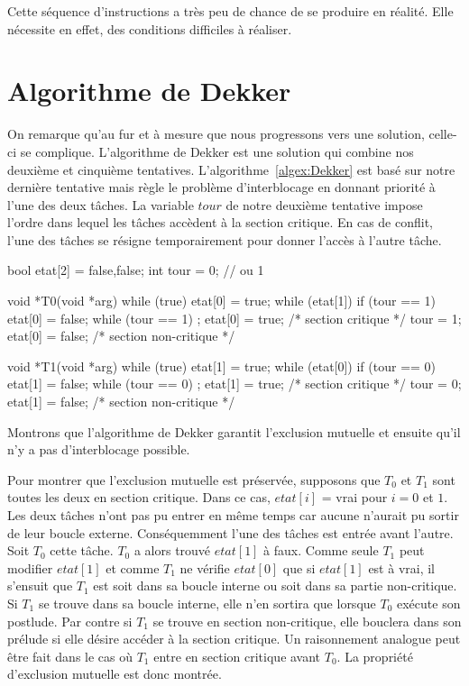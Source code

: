 \par\noindent
Cette séquence d'instructions a très peu de chance de se produire en réalité. Elle nécessite en effet, des conditions difficiles à réaliser.

\section{Algorithme de Dekker}
On remarque qu'au fur et à mesure que nous progressons vers une solution, celle-ci se complique. L'algorithme de Dekker est une solution qui combine nos deuxième et cinquième tentatives.
L'algorithme~\ref{algex:Dekker} est basé sur notre dernière tentative mais règle le problème d'interblocage en donnant priorité à l'une des deux tâches.  La variable $tour$ de notre deuxième tentative impose l'ordre dans lequel les tâches accèdent à la section critique.  En cas de conflit, l'une des tâches se résigne temporairement pour donner l'accès à l'autre tâche.

\begin{codeblock}[label=algex:Dekker, title={Algorithme de Dekker}]
bool etat[2] = {false,false};
int tour = 0; // ou 1

void *T0(void *arg)
{
  while (true) {
    etat[0] = true;
    while (etat[1])
      if (tour == 1) {
        etat[0] = false;
        while (tour == 1)
          ;
        etat[0] = true;
      }
    /* section critique */
    tour = 1;
    etat[0] = false;
    /* section non-critique */
  }
}

void *T1(void *arg)
{
  while (true) {
    etat[1] = true;
    while (etat[0])
      if (tour == 0) {
        etat[1] = false;
        while (tour == 0)
          ;
        etat[1] = true;
      }
    /* section critique */
    tour = 0;
    etat[1] = false;
    /* section non-critique */
  }
}
\end{codeblock}

Montrons que l'algorithme de Dekker garantit l'exclusion mutuelle et ensuite qu'il n'y a pas d'interblocage possible.

Pour montrer que l'exclusion mutuelle est préservée, supposons que $T_0$ et $T_1$ sont toutes les deux en section critique. Dans ce cas, $etat[i]$ = vrai pour $i=0$ et $1$.  Les deux tâches n'ont pas pu entrer en même temps car aucune n'aurait pu sortir de leur boucle externe.  Conséquemment l'une des tâches est entrée avant l'autre.  Soit $T_0$ cette tâche.
$T_0$ a alors trouvé $etat[1]$ à faux.  Comme seule $T_1$ peut modifier $etat[1]$ et comme $T_1$ ne vérifie $etat[0]$ que si $etat[1]$ est à vrai, il s'ensuit que $T_1$ est soit dans sa boucle interne ou soit dans sa partie non-critique.  Si $T_1$ se trouve dans sa boucle interne, elle n'en sortira que lorsque $T_0$ exécute son postlude.
Par contre si $T_1$ se trouve en section non-critique, elle bouclera dans son prélude si elle désire accéder à la section critique.  Un raisonnement analogue peut être fait dans le cas où $T_1$ entre en section critique avant $T_0$.
La propriété d'exclusion mutuelle est donc montrée.

